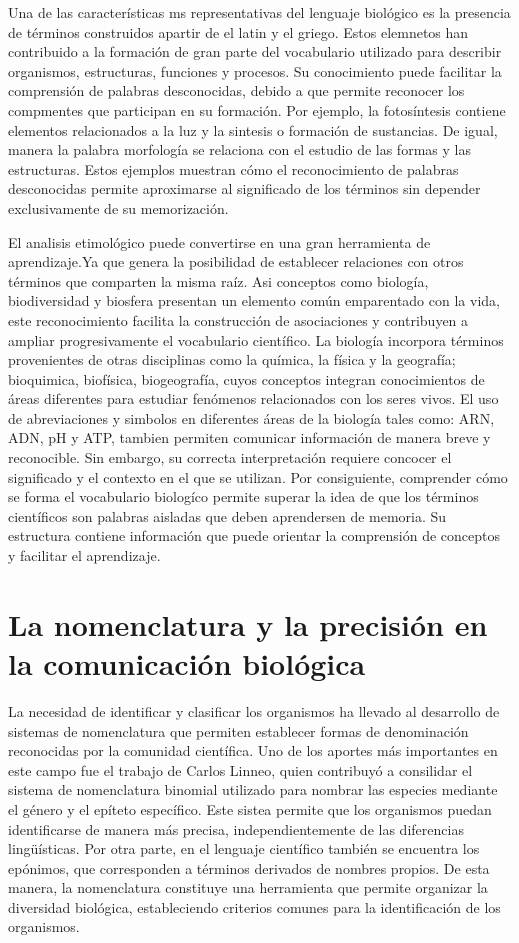 \documentclass[12pt]{article}
\begin{document}
Una de las características ms representativas del lenguaje biológico es la presencia de términos construidos apartir de el latin y  el griego. Estos elemnetos han contribuido a la formación de gran parte del vocabulario utilizado para describir organismos, estructuras, funciones y procesos. Su conocimiento puede facilitar la comprensión de palabras desconocidas, debido a que permite reconocer los compmentes que participan en su formación. Por ejemplo, la fotosíntesis contiene elementos relacionados a la luz y la sintesis o formación de sustancias. De igual, manera la palabra morfología se relaciona con el estudio de las formas y las estructuras. Estos ejemplos muestran cómo el reconocimiento de palabras desconocidas permite aproximarse al significado de los términos sin depender exclusivamente de su memorización.

El analisis etimológico puede convertirse en una gran herramienta de aprendizaje.Ya que genera la posibilidad de establecer relaciones con otros términos que comparten la misma raíz. Asi conceptos como biología, biodiversidad y biosfera presentan un elemento común emparentado con la vida, este reconocimiento facilita la construcción de asociaciones y contribuyen a ampliar progresivamente el vocabulario científico. La biología incorpora términos provenientes de otras disciplinas como la química, la física y la geografía; bioquimica, biofísica, biogeografía, cuyos conceptos integran conocimientos de áreas diferentes para estudiar fenómenos relacionados con los seres vivos. El uso de abreviaciones y simbolos en diferentes áreas de la biología tales como: ARN, ADN, pH y ATP, tambien permiten comunicar información de manera breve y reconocible. Sin embargo, su correcta interpretación requiere concocer el significado y el contexto en el que se utilizan. Por consiguiente, comprender cómo se forma el vocabulario biologíco permite superar la idea de que los términos científicos son palabras aisladas que deben aprendersen de memoria. Su estructura contiene información que puede orientar la comprensión de conceptos y facilitar el aprendizaje.

\section{La nomenclatura y la precisión en la comunicación biológica}
La necesidad de identificar y clasificar los organismos ha llevado al desarrollo de sistemas de nomenclatura que permiten establecer formas de denominación reconocidas por la comunidad científica. Uno de los aportes más importantes en este campo fue el trabajo de Carlos Linneo, quien contribuyó a consilidar el sistema de nomenclatura binomial utilizado para nombrar las especies mediante el género y el epíteto específico. Este sistea permite que los organismos puedan identificarse de manera más precisa, independientemente de las diferencias lingüísticas. Por otra parte, en el lenguaje científico también se encuentra los epónimos, que corresponden a términos derivados de nombres propios. De esta manera, la nomenclatura constituye una herramienta que permite organizar la diversidad biológica, estableciendo criterios comunes para la identificación de los organismos.
\end{document}

